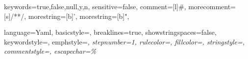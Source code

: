 {
  keywords={true,false,null,y,n},
  sensitive=false,
  comment=[l]{\#},
  morecomment=[s]{/*}{*/},
  morestring=[b]',
  morestring=[b]",
}

{
  language=Yaml,
  basicstyle=\YAMLkeystyle,
  breaklines=true,
  showstringspaces=false,
  keywordstyle=\color{Mulberry},
  emphstyle=\itshape,
  stepnumber=1,
  rulecolor=\color{blue!50},
  fillcolor=\color{blue!20},
  stringstyle=\color{BitterSweet},
  commentstyle=\color{BrickRed},
  escapechar=\%
}
